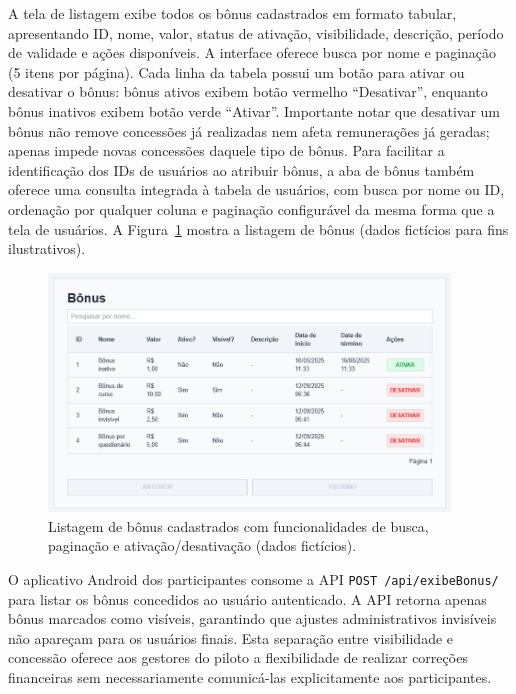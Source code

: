 A tela de listagem exibe todos os bônus
cadastrados em formato tabular, apresentando ID, nome, valor, status de ativação,
visibilidade, descrição, período de validade e ações disponíveis. A interface
oferece busca por nome e paginação (5 itens por página). Cada linha da tabela
possui um botão para ativar ou desativar o bônus: bônus ativos exibem
botão vermelho ``Desativar'', enquanto bônus inativos exibem botão verde
``Ativar''. Importante notar que desativar um bônus não remove concessões já
realizadas nem afeta remunerações já geradas; apenas impede novas concessões
daquele tipo de bônus. Para facilitar a identificação dos IDs de usuários ao
atribuir bônus, a aba de bônus também oferece uma consulta integrada à tabela de
usuários, com busca por nome ou ID, ordenação por qualquer coluna e
paginação configurável da mesma forma que a tela de usuários. A Figura~\ref{fig:bonus_listagem_form} mostra a listagem de bônus (dados fictícios para fins ilustrativos).

\begin{figure}[htb]
    \centering
    \includegraphics[width=0.95\textwidth]{figuras/bonus_listar.PNG}
    \caption{Listagem de bônus cadastrados com funcionalidades de busca, paginação e ativação/desativação (dados fictícios).}
    \label{fig:bonus_listagem_form}
  \end{figure}
 

O aplicativo Android dos participantes
consome a API \texttt{POST /api/exibeBonus/} para listar os bônus concedidos ao
usuário autenticado. A API retorna apenas bônus marcados como visíveis, garantindo que ajustes administrativos invisíveis não
apareçam para os usuários finais. Esta separação entre visibilidade e concessão
oferece aos gestores do piloto a flexibilidade de realizar correções financeiras
sem necessariamente comunicá-las explicitamente aos participantes.

